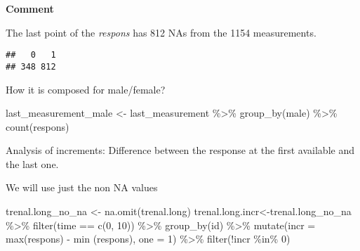 \documentclass[
]{article}
\newenvironment{Shaded}{\begin{snugshade}}{\end{snugshade}}
\newcommand{\AttributeTok}[1]{\textcolor[rgb]{0.77,0.63,0.00}{#1}}
\newcommand{\DecValTok}[1]{\textcolor[rgb]{0.00,0.00,0.81}{#1}}
\newcommand{\FunctionTok}[1]{\textcolor[rgb]{0.00,0.00,0.00}{#1}}
\newcommand{\NormalTok}[1]{#1}
\newcommand{\OtherTok}[1]{\textcolor[rgb]{0.56,0.35,0.01}{#1}}
\newcommand{\SpecialCharTok}[1]{\textcolor[rgb]{0.00,0.00,0.00}{#1}}
\begin{document}
\textbf{Comment}

The last point of the \emph{respons} has 812 NAs from the 1154
measurements.

\begin{Shaded}
\end{Shaded}

\begin{verbatim}
##   0   1 
## 348 812
\end{verbatim}

How it is composed for male/female?

\begin{Shaded}
\begin{Highlighting}[]
\NormalTok{last\_measurement\_male }\OtherTok{\textless{}{-}}\NormalTok{ last\_measurement }\SpecialCharTok{\%\textgreater{}\%} 
  \FunctionTok{group\_by}\NormalTok{(male) }\SpecialCharTok{\%\textgreater{}\%} 
\FunctionTok{count}\NormalTok{(respons)}
\end{Highlighting}
\end{Shaded}

Analysis of increments: Difference between the response at the first
available and the last one.

We will use just the non NA values

\begin{Shaded}
\begin{Highlighting}[]
\NormalTok{trenal.long\_no\_na }\OtherTok{\textless{}{-}} \FunctionTok{na.omit}\NormalTok{(trenal.long)}
\NormalTok{trenal.long.incr}\OtherTok{\textless{}{-}}\NormalTok{trenal.long\_no\_na }\SpecialCharTok{\%\textgreater{}\%} 
  \FunctionTok{filter}\NormalTok{(time }\SpecialCharTok{==} \FunctionTok{c}\NormalTok{(}\DecValTok{0}\NormalTok{, }\DecValTok{10}\NormalTok{)) }\SpecialCharTok{\%\textgreater{}\%} 
  \FunctionTok{group\_by}\NormalTok{(id) }\SpecialCharTok{\%\textgreater{}\%} 
  \FunctionTok{mutate}\NormalTok{(}\AttributeTok{incr =} \FunctionTok{max}\NormalTok{(respons) }\SpecialCharTok{{-}} \FunctionTok{min}\NormalTok{ (respons), }\AttributeTok{one =} \DecValTok{1}\NormalTok{) }\SpecialCharTok{\%\textgreater{}\%} 
  \FunctionTok{filter}\NormalTok{(}\SpecialCharTok{!}\NormalTok{incr }\SpecialCharTok{\%in\%} \DecValTok{0}\NormalTok{)}
\end{Highlighting}
\end{Shaded}
\end{document}
